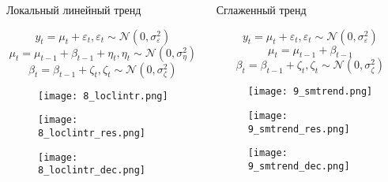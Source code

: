 \documentclass{beamer}
\begin{document}
\begin{frame}[fragile]
\begin{columns}[T]
\begin{column}{.32\textwidth}
\begin{columns}[T]
\begin{column}{.49\textwidth}
\begin{block}{Локальный линейный тренд}

\vspace{-0.25cm}

\[
y_t = \mu_t + \varepsilon_t, \varepsilon_t \sim \mathcal{N}(0, \sigma^2_\varepsilon)
\]
\[
\mu_t = \mu_{t-1} + \beta_{t-1} + \eta_t, \eta_t \sim \mathcal{N}(0, \sigma^2_\eta)
\]
\[
\beta_t = \beta_{t-1} + \zeta_t, \zeta_t \sim \mathcal{N}(0, \sigma_\zeta^2)
\]

\begin{figure}[htb]
\texttt{[image: 8\_loclintr.png]}
\end{figure}

\begin{figure}[htb]
\texttt{[image: 8\_loclintr\_res.png]}
\end{figure}

\begin{figure}[htb]
\texttt{[image: 8\_loclintr\_dec.png]}
\end{figure}

\end{block}
\end{column}

\begin{column}{.5\textwidth}
\begin{block}{Сглаженный тренд}

\vspace{-0.25cm}

\[
y_t = \mu_t + \varepsilon_t, \varepsilon_t \sim \mathcal{N}(0, \sigma^2_\varepsilon)
\]
\[
\mu_t = \mu_{t-1} + \beta_{t-1}
\]
\[
\beta_t = \beta_{t-1} + \zeta_t, \zeta_t \sim \mathcal{N}(0, \sigma_\zeta^2)
\]

\begin{figure}[htb]
\texttt{[image: 9\_smtrend.png]}
\end{figure}

\vspace{-0.13cm}

\begin{figure}[htb]
\texttt{[image: 9\_smtrend\_res.png]}
\end{figure}

\vspace{-0.14cm}

\begin{figure}[htb]
\texttt{[image: 9\_smtrend\_dec.png]}
\end{figure}


\end{block}
\end{column}
\end{columns}
\end{column}
\end{columns}
\end{frame}
\end{document}
